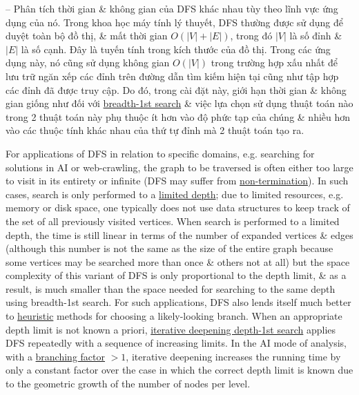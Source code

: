 \documentclass[oneside]{book}
\begin{document}
-- Phân tích thời gian \& không gian của DFS khác nhau tùy theo lĩnh vực ứng dụng của nó. Trong khoa học máy tính lý thuyết, DFS thường được sử dụng để duyệt toàn bộ đồ thị, \& mất thời gian $O(|V| + |E|)$, trong đó $|V|$ là số đỉnh \& $|E|$ là số cạnh. Đây là tuyến tính trong kích thước của đồ thị. Trong các ứng dụng này, nó cũng sử dụng không gian $O(|V|)$ trong trường hợp xấu nhất để lưu trữ ngăn xếp các đỉnh trên đường dẫn tìm kiếm hiện tại cũng như tập hợp các đỉnh đã được truy cập. Do đó, trong cài đặt này, giới hạn thời gian \& không gian giống như đối với \href{https://en.wikipedia.org/wiki/Breadth-first_search}{breadth-1st search} \& việc lựa chọn sử dụng thuật toán nào trong 2 thuật toán này phụ thuộc ít hơn vào độ phức tạp của chúng \& nhiều hơn vào các thuộc tính khác nhau của thứ tự đỉnh mà 2 thuật toán tạo ra.

For applications of DFS in relation to specific domains, e.g. searching for solutions in AI or web-crawling, the graph to be traversed is often either too large to visit in its entirety or infinite (DFS may suffer from \href{https://en.wikipedia.org/wiki/Halting_problem}{non-termination}). In such cases, search is only performed to a \href{https://en.wikipedia.org/wiki/Depth-limited_search}{limited depth}; due to limited resources, e.g. memory or disk space, one typically does not use data structures to keep track of the set of all previously visited vertices. When search is performed to a limited depth, the time is still linear in terms of the number of expanded vertices \& edges (although this number is not the same as the size of the entire graph because some vertices may be searched more than once \& others not at all) but the space complexity of this variant of DFS is only proportional to the depth limit, \& as a result, is much smaller than the space needed for searching to the same depth using breadth-1st search. For such applications, DFS also lends itself much better to \href{https://en.wikipedia.org/wiki/Heuristics}{heuristic} methods for choosing a likely-looking branch. When an appropriate depth limit is not known a priori, \href{https://en.wikipedia.org/wiki/Iterative_deepening_depth-first_search}{iterative deepening depth-1st search} applies DFS repeatedly with a sequence of increasing limits. In the AI mode of analysis, with a \href{https://en.wikipedia.org/wiki/Branching_factor}{branching factor} $> 1$, iterative deepening increases the running time by only a constant factor over the case in which the correct depth limit is known due to the geometric growth of the number of nodes per level.
\end{document}
